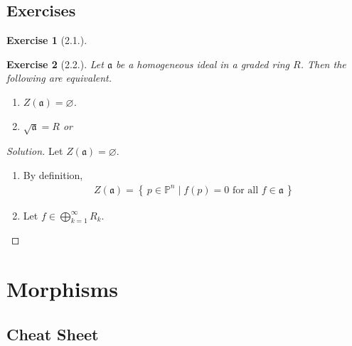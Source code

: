 \documentclass[11pt]{book}
\newtheorem{exercise}{Exercise}[section]
\newenvironment{solution}
  {\renewcommand{\qedsymbol}{}\begin{proof}[Solution]}
  {\end{proof}}
\theoremstyle{definition}
\numberwithin{equation}{section}
\newcommand{\makeset}[2]{\left\{\, #1 \mathrel{\mid} #2 \,\right\}}
\begin{document}
\section{Exercises}
\begin{exercise}[2.1.]
    
\end{exercise}

\begin{exercise}[2.2.]
    Let \(\mathfrak{a}\) be a homogeneous ideal in a graded ring \(R\). Then the following are equivalent.
    \begin{enumerate}
        \item \(Z(\mathfrak{a}) = \varnothing\).
        \item \(\sqrt{\mathfrak{a}} = R\) or
    \end{enumerate}
\end{exercise}
\begin{solution}
    Let \(Z(\mathfrak{a}) = \varnothing\).
    \begin{enumerate}
        \item By definition,
        \begin{align*}
            Z(\mathfrak{a}) = \makeset{p \in \mathbb{P}^n}{f(p) = 0 \text{ for all } f \in \mathfrak{a}}
        \end{align*}
        \item Let \(f \in \bigoplus_{k=1}^\infty R_k\).
    \end{enumerate}
\end{solution}


\chapter{Morphisms}
\newpage
\section{Cheat Sheet}

\newpage
\end{document}
